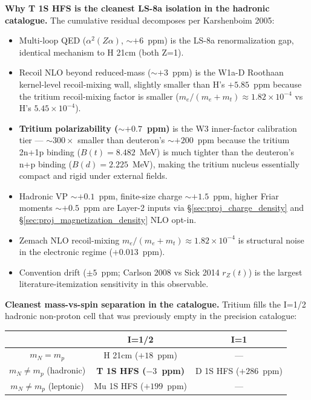 \documentclass[11pt]{article}
\begin{document}
\textbf{Why T 1S HFS is the cleanest LS-8a isolation in the hadronic
catalogue.}  The cumulative residual decomposes per Karshenboim 2005:
\begin{itemize}\setlength\itemsep{0pt}
\item Multi-loop QED ($\alpha^2(Z\alpha)$, $\sim +6$~ppm) is the
LS-8a renormalization gap, identical mechanism to H 21cm (both Z=1).
\item Recoil NLO beyond reduced-mass ($\sim +3$~ppm) is the W1a-D
Roothaan kernel-level recoil-mixing wall, slightly smaller than H's
$+5.85$~ppm because the tritium recoil-mixing factor is smaller
($m_e/(m_e+m_t) \approx 1.82 \times 10^{-4}$ vs H's $5.45 \times 10^{-4}$).
\item \textbf{Tritium polarizability ($\sim +0.7$~ppm)} is the
W3 inner-factor calibration tier --- $\sim 300\times$ smaller than
deuteron's $\sim +200$~ppm because the tritium 2n+1p binding
($B(t) = 8.482$~MeV) is much tighter than the deuteron's n+p binding
($B(d) = 2.225$~MeV), making the tritium nucleus essentially compact
and rigid under external fields.
\item Hadronic VP $\sim +0.1$~ppm, finite-size charge $\sim +1.5$~ppm,
higher Friar moments $\sim +0.5$~ppm are Layer-2 inputs via
\S\ref{sec:proj_charge_density} and \S\ref{sec:proj_magnetization_density}
NLO opt-in.
\item Zemach NLO recoil-mixing $m_e/(m_e+m_t) \approx 1.82 \times 10^{-4}$
is structural noise in the electronic regime ($+0.013$~ppm).
\item Convention drift ($\pm 5$~ppm; Carlson 2008 vs Sick 2014 $r_Z(t)$)
is the largest literature-itemization sensitivity in this observable.
\end{itemize}

\textbf{Cleanest mass-vs-spin separation in the catalogue.}  Tritium
fills the I=1/2 hadronic non-proton cell that was previously empty in
the precision catalogue:

\begin{center}
\small
\begin{tabular}{c|c|c}
& I=1/2 & I=1 \\
\hline
$m_N = m_p$ & H 21cm ($+18$~ppm) & --- \\
$m_N \neq m_p$ (hadronic) & \textbf{T 1S HFS ($-3$~ppm)} & D 1S HFS ($+286$~ppm) \\
$m_N \neq m_p$ (leptonic) & Mu 1S HFS ($+199$~ppm) & --- \\
\end{tabular}
\end{center}
\end{document}
